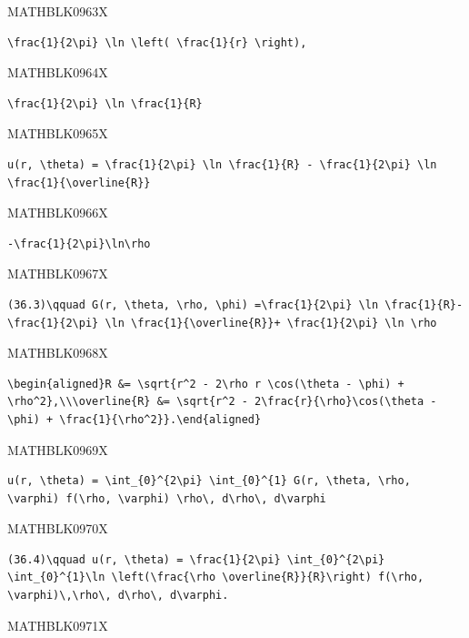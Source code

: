 \documentclass[
  ukrainian,
]{article}
\begin{document}
MATHBLK0963X

\begin{verbatim}
\frac{1}{2\pi} \ln \left( \frac{1}{r} \right),
\end{verbatim}

MATHBLK0964X

\begin{verbatim}
\frac{1}{2\pi} \ln \frac{1}{R}
\end{verbatim}

MATHBLK0965X

\begin{verbatim}
u(r, \theta) = \frac{1}{2\pi} \ln \frac{1}{R} - \frac{1}{2\pi} \ln \frac{1}{\overline{R}}
\end{verbatim}

MATHBLK0966X

\begin{verbatim}
-\frac{1}{2\pi}\ln\rho
\end{verbatim}

MATHBLK0967X

\begin{verbatim}
(36.3)\qquad G(r, \theta, \rho, \phi) =\frac{1}{2\pi} \ln \frac{1}{R}- \frac{1}{2\pi} \ln \frac{1}{\overline{R}}+ \frac{1}{2\pi} \ln \rho
\end{verbatim}

MATHBLK0968X

\begin{verbatim}
\begin{aligned}R &= \sqrt{r^2 - 2\rho r \cos(\theta - \phi) + \rho^2},\\\overline{R} &= \sqrt{r^2 - 2\frac{r}{\rho}\cos(\theta - \phi) + \frac{1}{\rho^2}}.\end{aligned}
\end{verbatim}

MATHBLK0969X

\begin{verbatim}
u(r, \theta) = \int_{0}^{2\pi} \int_{0}^{1} G(r, \theta, \rho, \varphi) f(\rho, \varphi) \rho\, d\rho\, d\varphi
\end{verbatim}

MATHBLK0970X

\begin{verbatim}
(36.4)\qquad u(r, \theta) = \frac{1}{2\pi} \int_{0}^{2\pi} \int_{0}^{1}\ln \left(\frac{\rho \overline{R}}{R}\right) f(\rho, \varphi)\,\rho\, d\rho\, d\varphi.
\end{verbatim}

MATHBLK0971X
\end{document}
